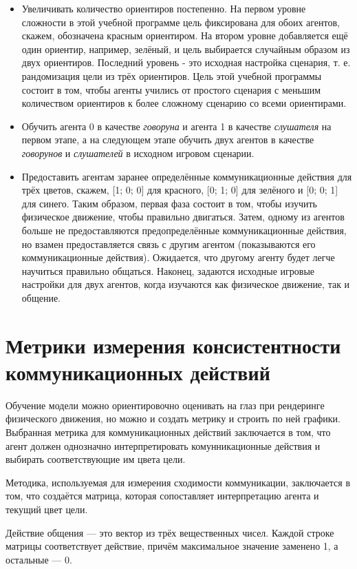 \begin{itemize}
    \item Увеличивать количество ориентиров постепенно. На первом уровне сложности в этой учебной программе цель фиксирована для обоих агентов, скажем, обозначена красным ориентиром. На втором уровне добавляется ещё один ориентир, например, зелёный, и цель выбирается случайным образом из двух ориентиров. Последний уровень - это исходная настройка сценария, т. е. рандомизация цели из трёх ориентиров. Цель этой учебной программы состоит в том, чтобы агенты учились от простого сценария с меньшим количеством ориентиров к более сложному сценарию со всеми ориентирами.
    \item Обучить агента 0 в качестве \textit{говоруна} и агента 1 в качестве \textit{слушателя} на первом этапе, а на следующем этапе обучить двух агентов в качестве \textit{говорунов} и \textit{слушателей} в исходном игровом сценарии.
    \item Предоставить агентам заранее определённые коммуникационные действия для трёх цветов, скажем, [1; 0; 0] для красного, [0; 1; 0] для зелёного и [0; 0; 1] для синего. Таким образом, первая фаза состоит в том, чтобы изучить физическое движение, чтобы правильно двигаться. Затем, одному из агентов больше не предоставляются предопределённые коммуникационные действия, но взамен предоставляется связь с другим агентом (показываются его коммуникационные действия). Ожидается, что другому агенту будет легче научиться правильно общаться. Наконец, задаются исходные игровые настройки для двух агентов, когда изучаются как физическое движение, так и общение.
\end{itemize}

\section{Метрики измерения консистентности коммуникационных действий}

Обучение модели можно ориентировочно оценивать на глаз при рендеринге физического движения, но можно и создать метрику и строить по ней графики. Выбранная метрика для коммуникационных действий заключается в том, что агент должен однозначно интерпретировать комунникационные действия и выбирать соответствующие им цвета цели.

Методика, используемая для измерения сходимости коммуникации, заключается в том, что создаётся матрица, которая сопоставляет интерпретацию агента и текущий цвет цели.

Действие общения --- это вектор из трёх вещественных чисел. Каждой строке матрицы соответствует действие, причём максимальное значение заменено 1, а остальные --- 0.

